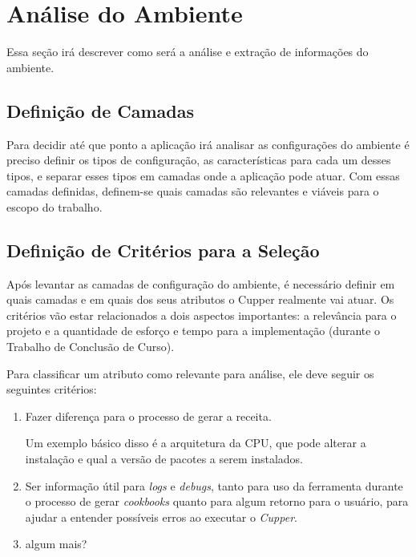 \section{Análise do Ambiente}
Essa seção irá descrever como será a análise e extração de informações do ambiente. 


\subsection{Definição de Camadas}
Para decidir até que ponto a aplicação irá analisar as configurações
do ambiente é preciso definir os tipos de configuração, as características para
cada um desses tipos, e separar esses tipos em camadas onde a aplicação pode atuar.
Com essas camadas definidas, definem-se quais camadas são relevantes e viáveis
para o escopo do trabalho.

\subsection{Definição de Critérios para a Seleção}
\label{sec:defcritcamada}
Após levantar as camadas de configuração do ambiente, é necessário definir em
quais camadas e em quais dos seus atributos o Cupper realmente vai atuar. 
Os critérios vão estar relacionados a dois aspectos importantes: a relevância 
para o projeto e a quantidade de esforço e tempo para a implementação 
(durante o Trabalho de Conclusão de Curso).

Para classificar um atributo como relevante para análise, ele deve seguir os
seguintes critérios:

\begin{enumerate}
\item Fazer diferença para o processo de gerar a receita.

Um exemplo básico disso é a arquitetura da CPU, que pode alterar a instalação
e qual a versão de pacotes a serem instalados.
\item Ser informação útil para \textit{logs} e \textit{debugs}, tanto para uso
da ferramenta durante o processo de gerar \textit{cookbooks} quanto para algum
retorno para o usuário, para ajudar a entender possíveis erros ao executar
o \textit{Cupper}.
\item {\color{red} algum mais?}
\end{enumerate}

